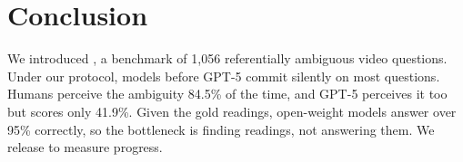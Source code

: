 \section{Conclusion}
\label{sec:conclusion}

We introduced \bench{}, a benchmark of 1{,}056 referentially ambiguous video questions. Under our protocol, models before GPT-5 commit silently on most questions. Humans perceive the ambiguity 84.5\% of the time, and GPT-5 perceives it too but scores only 41.9\%. Given the gold readings, open-weight models answer over 95\% correctly, so the bottleneck is finding readings, not answering them. We release \bench{} to measure progress.
